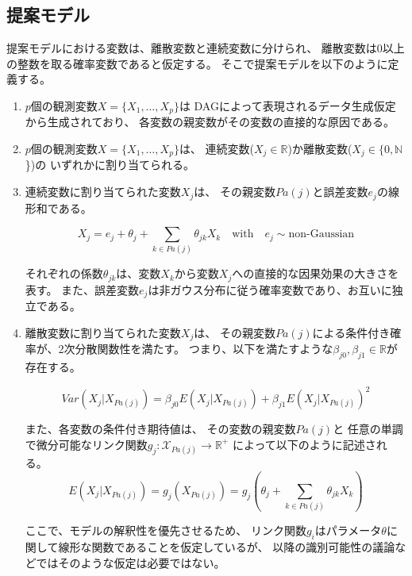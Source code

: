 
\subsection{提案モデル}

提案モデルにおける変数は、離散変数と連続変数に分けられ、
離散変数は0以上の整数を取る確率変数であると仮定する。
そこで提案モデルを以下のように定義する。

\begin{enumerate}
  \item
  $p$個の観測変数$X = \{ X_1, \dots, X_p \}$は
  DAGによって表現されるデータ生成仮定から生成されており、
  各変数の親変数がその変数の直接的な原因である。

  \item
  $p$個の観測変数$X = \{ X_1, \dots, X_p \}$は、
  連続変数($X_j \in \mathbb R$)か離散変数($X_j \in \{0, \mathbb N$\})の
  いずれかに割り当てられる。

  \item
  連続変数に割り当てられた変数$X_j$は、
  その親変数$Pa(j)$と誤差変数$e_j$の線形和である。

  \begin{equation}
    X_j = e_j + \theta_{j} + \sum_{k \in Pa(j)} \theta_{jk}X_k
    \quad \text{with} \quad e_j \sim \text{non-Gaussian}
    \label{eq:lingam_prop}
  \end{equation}

  それぞれの係数$\theta_{jk}$は、変数$X_k$から変数$X_j$への直接的な因果効果の大きさを表す。
  また、誤差変数$e_j$は非ガウス分布に従う確率変数であり、お互いに独立である。

  \item
  離散変数に割り当てられた変数$X_j$は、
  その親変数$Pa(j)$による条件付き確率が、2次分散関数性を満たす。
  つまり、以下を満たすような$\beta_{j0},\beta_{j1} \in \mathbb{R}$が存在する。

  \begin{equation}
    \mathit{Var}(X_j|X_{Pa(j)}) = \beta_{j0} E(X_j | X_{Pa(j)}) + \beta_{j1} E(X_j | X_{Pa(j)})^2
    \label{QVF_prop}
  \end{equation}

  また、各変数の条件付き期待値は、
  その変数の親変数$Pa(j)$と
  任意の単調で微分可能なリンク関数$g_j \colon \mathcal X_{Pa(j)} \rightarrow \mathbb R^+$
  によって以下のように記述される。
  \begin{equation}
    E(X_j | X_{Pa(j)})
    = g_j(X_{Pa(j)})
    = g_j \left(\theta_j + \sum_{k \in Pa(j)} \theta_{jk}X_k \right)
  \end{equation}

  ここで、モデルの解釈性を優先させるため、
  リンク関数$g_i$はパラメータ$\theta$に関して線形な関数であることを仮定しているが、
  以降の識別可能性の議論などではそのような仮定は必要ではない。
\end{enumerate}

